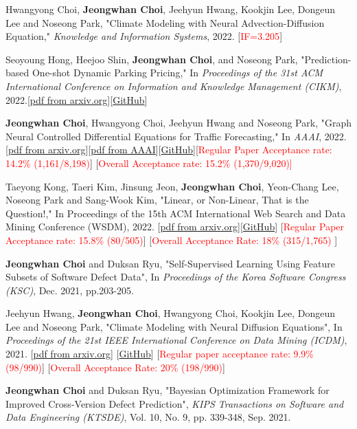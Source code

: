 \documentclass[10pt]{article}
\newenvironment{changemargin}[2]{
  \begin{list}{}{
    \setlength{\topsep}{0pt}
    \setlength{\leftmargin}{#1}
    \setlength{\rightmargin}{#2}
    \setlength{\listparindent}{\parindent}
    \setlength{\itemindent}{\parindent}
    \setlength{\parsep}{\parskip}
  }
  \item[]}{\end{list}
}
\newcommand{\presentation}[2]{
	{#1} \hfill \emph{#2}\\ \bigskip
}
\newcommand{\RED}[1]{\textcolor{red}{#1}}
\newenvironment{body} {
	\vspace*{-16pt}
	\begin{changemargin}{-0.25in}{-0.5in}
  }
	{\end{changemargin}
}
\begin{document}
\begin{body}
	\vspace{14pt}

\presentation{
Hwangyong Choi, \textbf{Jeongwhan Choi}, Jeehyun Hwang, Kookjin Lee, Dongeun Lee and Noseong Park, "Climate Modeling with Neural Advection-Diffusion Equation," \emph{Knowledge and Information Systems}, 2022. [\RED{IF=3.205}]}{}
\presentation{Seoyoung Hong, Heejoo Shin, \textbf{Jeongwhan Choi}, and Noseong Park, "Prediction-based One-shot Dynamic Parking Pricing," In \emph{Proceedings of the 31st ACM International Conference on Information and Knowledge Management (CIKM)}, 2022.[\href{https://arxiv.org/abs/2208.14231}{pdf from arxiv.org}][\href{https://github.com/jeongwhanchoi/one-shot-optimization}{GitHub}]}{}
\presentation{\textbf{Jeongwhan Choi}, Hwangyong Choi, Jeehyun Hwang and Noseong Park, "Graph Neural Controlled Differential Equations for Traffic Forecasting," In \emph{AAAI}, 2022. [\href{https://arxiv.org/abs/2112.03558}{pdf from arxiv.org}][\href{https://ojs.aaai.org/index.php/AAAI/article/download/20587/20346}{pdf from AAAI}][\href{https://github.com/jeongwhanchoi/STG-NCDE}{GitHub}][\RED{Regular Paper Acceptance rate: 14.2\% (1,161/8,198)}] [\RED{Overall Acceptance rate: 15.2\% (1,370/9,020)] }} {}
\presentation{Taeyong Kong, Taeri Kim, Jinsung Jeon, \textbf{Jeongwhan Choi}, Yeon-Chang Lee, Noseong Park and Sang-Wook Kim, "Linear, or Non-Linear, That is the Question!," In Proceedings of the 15th ACM International Web Search and Data Mining Conference (WSDM), 2022.  [\href{https://arxiv.org/abs/2111.07265}{pdf from arxiv.org}][\href{https://github.com/jeongwhanchoi/HMLET}{GitHub}] [\RED{Regular Paper Acceptance rate: 15.8\% (80/505)}] [\RED{Overall Acceptance Rate: 18\%  (315/1,765)} ]}{}
\presentation{\textbf{Jeongwhan Choi} and Duksan Ryu, "Self-Supervised Learning Using Feature Subsets of Software Defect Data",  In \emph{Proceedings of the Korea Software Congress (KSC)}, Dec. 2021, pp.203-205.}{}
\presentation{Jeehyun Hwang, \textbf{Jeongwhan Choi}, Hwangyong Choi, Kookjin Lee, Dongeun Lee and Noseong Park, "Climate Modeling with Neural Diffusion Equations", In \emph{Proceedings of the 21st IEEE International Conference on Data Mining (ICDM)}, 2021.  [\href{https://arxiv.org/abs/2111.06011}{pdf from arxiv.org}] [\href{https://github.com/jeongwhanchoi/Neural-Diffusion-Equation}{GitHub}] [\RED{Regular paper acceptance rate: 9.9\%  (98/990)}] [\RED{Overall Acceptance Rate: 20\%  (198/990)}]}{}
\presentation{\textbf{Jeongwhan Choi} and Duksan Ryu, "Bayesian Optimization Framework for Improved Cross-Version Defect Prediction", \emph{KIPS Transactions on Software and Data Engineering (KTSDE)}, Vol. 10, No. 9, pp. 339-348, Sep. 2021.}{}

\end{body}
\end{document}
